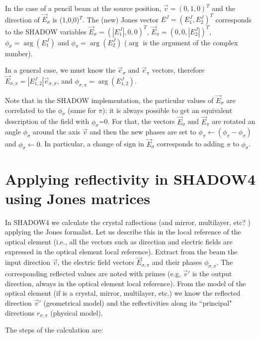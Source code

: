 \documentclass{iucr}
\begin{document}
In the case of a pencil beam at the source position, $\vec{v}=(0,1,0)^T$ and the direction of $\vec{E}_\sigma$ is (1,0,0)$^T$. The (new) Jones vector $E^J=(E^J_1,E^J_2)^T$ corresponds to the SHADOW variables $\vec{E}_\sigma=(|E^J_1|,0,0)^T$, $\vec{E}_\pi=(0,0,|E^J_2|)^T$, $\phi_\sigma=\arg(E^J_1)$ and $\phi_\pi=\arg(E^J_2)$ ($\arg$ is the argument of the complex number).

In a general case, we must know the $\vec{e}_\sigma$ and $\vec{e}_\pi$ vectors, therefore $\vec{E}_{\sigma,\pi}=|E_{1,2}^J| \vec{e}_{\sigma,\pi}$, and $\phi_{\sigma,\pi}=\arg(E^J_{1,2 })$.



Note that in the SHADOW implementation, the particular values of $\vec{E}_\sigma$ are correlated to the $\phi_\sigma$ (same for $\pi$): it is always possible to get an equivalent description of the field with $\phi_\sigma$=0. For that, the vectors $\vec{E}_\sigma$ and $\vec{E}_\pi$ are rotated an angle $\phi_\sigma$ around the axis $\vec{v}$ and then the new phases are set to $\phi_\pi \xleftarrow{}(\phi_\pi-\phi_\sigma)$ and $\phi_\sigma\xleftarrow{}0$. In particular, a change of sign in $\vec{E}_\sigma$ corresponds to adding $\pi$ to $\phi_\sigma$.

\section{Applying reflectivity in SHADOW4 using Jones matrices }\label{sec:JonesInS4}

In SHADOW4 we calculate the crystal raflections (and mirror, multilayer, etc? ) applying the Jones formalist. Let us describe this in the local reference of the optical element (i.e., all the vectors such as direction and electric fields are expressed in the optical element local reference). Extract from the beam the input direction $\vec{v}$, the electric field vectors $\vec{E}_{\sigma,\pi}$ and their phases $\phi_{\sigma,\pi}$. The corresponding reflected values are noted with primes (e.g, $\vec{v}'$ is the output direction, always in the optical element local reference). From the model of the optical element (if is a crystal, mirror, multilayer, etc.) we know the reflected direction $\vec{v}'$ (geometrical model) and the reflectivities along its ``principal" directions $r_{\sigma,\pi}$ (physical model).

The steps of the calculation are:
\end{document}
